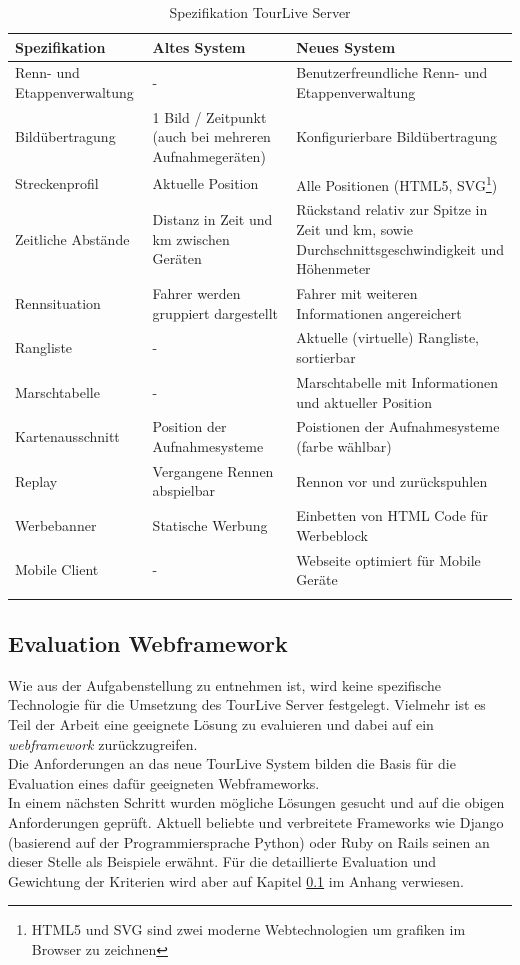 \begin{longtable}{  p{3.5cm} | p{4.3cm} | p{4.3cm} }
    \textbf{Spezifikation} & \textbf{Altes System} & \textbf{Neues System} \\
    \hline\hline
Renn- und Etappenverwaltung & - & Benutzerfreundliche Renn- und Etappenverwaltung
\\ \hline
Bildübertragung & 1 Bild / Zeitpunkt (auch bei mehreren Aufnahmegeräten) & Konfigurierbare Bildübertragung  
    \\ \hline
Streckenprofil & Aktuelle Position & Alle Positionen (HTML5, SVG\footnote{HTML5 und SVG sind zwei moderne Webtechnologien um grafiken im Browser zu zeichnen})
	\\ \hline
	Zeitliche Abstände & Distanz in Zeit und km zwischen Geräten & Rückstand relativ zur Spitze in Zeit und km, sowie Durchschnittsgeschwindigkeit und Höhenmeter
	\\ \hline
Rennsituation & Fahrer werden gruppiert dargestellt & Fahrer mit weiteren Informationen angereichert
	\\ \hline
Rangliste & - & Aktuelle (virtuelle) Rangliste, sortierbar
	\\ \hline
Marschtabelle & - & Marschtabelle mit Informationen und aktueller Position
	\\ \hline
Kartenausschnitt & Position der Aufnahmesysteme & Poistionen der Aufnahmesysteme (farbe wählbar)
	\\ \hline
Replay & Vergangene Rennen abspielbar & Rennon vor und zurückspuhlen
	\\ \hline
Werbebanner & Statische Werbung & Einbetten von HTML Code für Werbeblock
	\\ \hline
Mobile Client & - & Webseite optimiert für Mobile Geräte
	\\ \hline

\caption{Spezifikation TourLive Server}
\label{tab:tourlivewebspeztable}
\end{longtable}

\subsection{Evaluation Webframework}
\label{sec:evaluationwebframework}
Wie aus der Aufgabenstellung zu entnehmen ist, wird keine spezifische Technologie für die Umsetzung des TourLive Server festgelegt. Vielmehr ist es Teil der Arbeit eine geeignete Lösung zu evaluieren und dabei auf ein \textit{\gls{webframework}} zurückzugreifen.\\
Die Anforderungen an das neue TourLive System bilden die Basis für die Evaluation eines dafür geeigneten Webframeworks.
\\
In einem nächsten Schritt wurden mögliche Lösungen gesucht und auf die obigen Anforderungen geprüft. Aktuell beliebte und verbreitete Frameworks wie Django (basierend auf der Programmiersprache Python) oder Ruby on Rails seinen an dieser Stelle als Beispiele erwähnt. Für die detaillierte Evaluation und Gewichtung der Kriterien wird aber auf Kapitel \ref{sec:evaluationwebframework} im Anhang verwiesen.

